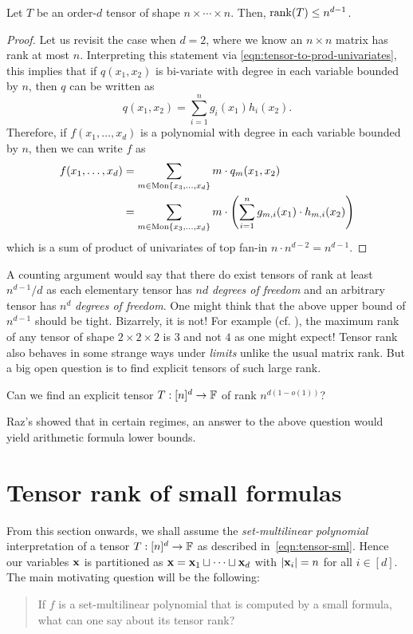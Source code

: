 \begin{lemma}\label{lem:tensor-rank-trivial-upperbound}
  Let $T$ be an order-$d$ tensor of shape $n\times \cdots \times n$.
Then, $\operatorname{rank}(T) \leq n^{d-1}$.
\end{lemma}
\begin{proof}
  Let us revisit the case when $d=2$, where we know an $n\times n$ matrix has rank at most $n$.
Interpreting this statement via \eqref{eqn:tensor-to-prod-univariates}, this implies that if $q(x_1,x_2)$ is bi-variate with degree in each variable bounded by $n$, then $q$ can be written as
\[
q(x_1,x_2) = \sum_{i=1}^n g_i(x_1) h_i(x_2).
\]
Therefore, if $f(x_1,\ldots, x_d)$ is a polynomial with degree in each variable bounded by $n$, then we can write $f$ as
\begin{align*}
f(x_1,\ldots, x_d) &= \sum_{m \in \mathrm{Mon}\left\{x_3,\ldots, x_d\right\}} m \cdot q_m(x_1,x_2)\\
& = \sum_{m \in \mathrm{Mon}\left\{x_3,\ldots, x_d\right\}} m \cdot \left(\sum_{i=1}^n g_{m,i}(x_1) \cdot h_{m,i}(x_2)\right)
\end{align*}
which is a sum of product of univariates of top fan-in $n \cdot n^{d-2} = n^{d-1}$. 
\end{proof}

A counting argument would say that there do exist tensors of rank at least $n^{d-1}/d$ as each elementary tensor has $nd$ \emph{degrees of freedom} and an arbitrary tensor has $n^d$ \emph{degrees of freedom}.
One might think that the above upper bound of $n^{d-1}$ should be tight.
Bizarrely, it is not!
For example (cf.
\cite{p85}), the maximum rank of any tensor of shape $2\times 2 \times 2$ is $3$ and not $4$ as one might expect!
Tensor rank also behaves in some strange ways under \emph{limits} unlike the usual matrix rank.
But a big open question is to find explicit tensors of such large rank.

\begin{openproblem}
Can we find an explicit tensor $T: [n]^d \rightarrow \mathbb{F}$ of rank $n^{d(1 - o(1))}$?
\end{openproblem}

Raz's \cite{raz10} showed that in certain regimes, an answer to the above question would yield arithmetic formula lower bounds. 

\section{Tensor rank of small formulas}

From this section onwards, we shall assume the \emph{set-multilinear polynomial} interpretation of a tensor $T:[n]^d \rightarrow \mathbb{F}$ as described in~\eqref{eqn:tensor-sml}.
Hence our variables $\mathbf{x}$ is partitioned as $\mathbf{x} = \mathbf{x}_1 \sqcup \cdots \sqcup \mathbf{x}_d$ with $\left|\mathbf{x}_i\right| = n$ for all $i\in [d]$.
The main motivating question will be the following:
\begin{quote}
If $f$ is a set-multilinear polynomial that is computed by a small formula, what can one say about its tensor rank?
\end{quote}


